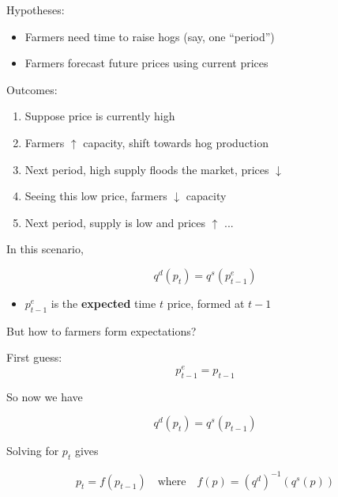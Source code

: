\documentclass[
    xcolor={svgnames,dvipsnames},
    hyperref={colorlinks, citecolor=DeepPink4, linkcolor=DarkRed, urlcolor=DarkBlue}
    ]{beamer}  %
\newcommand{\1}{\mathbbm 1}
\begin{document}
\begin{frame}
    
    Hypotheses: 

    \begin{itemize}
        \item Farmers need time to raise hogs (say, one ``period'')
            \vspace{0.3em}
        \item Farmers forecast future prices using current prices
    \end{itemize}

    Outcomes:

    \begin{enumerate}
        \item Suppose price is currently high
            \vspace{0.3em}
        \item Farmers $\uparrow$ capacity, shift towards hog production
            \vspace{0.3em}
        \item Next period, high supply floods the market, prices $\downarrow$
            \vspace{0.3em}
        \item Seeing this low price, farmers $\downarrow$ capacity
            \vspace{0.3em}
        \item Next period, supply is low and prices $\uparrow$ ...
    \end{enumerate}

\end{frame}

\begin{frame}

    In this scenario,
    
    $$
        q^d(p_t) = q^s(p^e_{t-1})
    $$

    \begin{itemize}
        \item $p^e_{t-1}$ is the \textbf{expected} time $t$ price, formed at $t-1$
    \end{itemize}

    \vspace{1em}
    \vspace{1em}

    But how to farmers form expectations?

\end{frame}

\begin{frame}
    
    First guess:
    \begin{equation*}
        p^e_{t-1} = p_{t-1}
    \end{equation*}

    So now we have

    $$
        q^d(p_t) = q^s(p_{t-1})
    $$

    Solving for $p_t$ gives

    $$
        p_t = f(p_{t-1})
        \quad \text{where} \quad
        f(p) = (q^d)^{-1} (q^s(p))
    $$

\end{frame}
\end{document}
